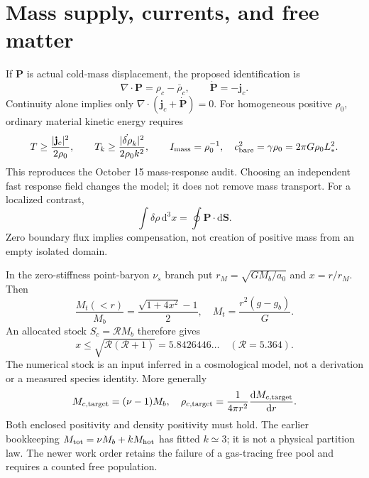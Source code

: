\documentclass[11pt]{article}
\newcommand{\dd}{\mathrm d}
\newcommand{\Mb}{M_b}
\begin{document}
\section{Mass supply, currents, and free matter}
If $\mathbf P$ is actual cold-mass displacement, the proposed identification is
\begin{equation}
 \nabla\cdot\mathbf P=\rho_c-\bar\rho_c,\qquad
 \dot{\mathbf P}=-\mathbf j_c.
\end{equation}
Continuity alone implies only
$\nabla\cdot(\mathbf j_c+\dot{\mathbf P})=0$.
For homogeneous positive $\rho_0$, ordinary material kinetic energy requires
\begin{equation}
 T\ge\frac{|\mathbf j_c|^2}{2\rho_0},\qquad
 T_k\ge\frac{|\dot{\delta\rho}_k|^2}{2\rho_0k^2},\qquad
 I_{\rm mass}=\rho_0^{-1},\quad
 c_{\rm bare}^2=\gamma\rho_0=2\pi G\rho_0L_*^2.
\end{equation}
This reproduces the October 15 mass-response audit. Choosing an independent
fast response field changes the model; it does not remove mass transport.
For a localized contrast,
\begin{equation}
 \int\delta\rho\,\dd^3x=\oint\mathbf P\cdot\dd\mathbf S.
\end{equation}
Zero boundary flux implies compensation, not creation of positive mass
from an empty isolated domain.

In the zero-stiffness point-baryon $\nu_s$ branch put
$r_M=\sqrt{G\Mb/a_0}$ and $x=r/r_M$. Then
\begin{equation}
 \frac{M_t(<r)}{\Mb}=\frac{\sqrt{1+4x^2}-1}{2},\quad
 M_t=\frac{r^2(g-g_b)}{G}.
\end{equation}
An allocated stock $S_c=\mathcal R\Mb$ therefore gives
\begin{equation}
 x\le\sqrt{\mathcal R(\mathcal R+1)}=5.8426446\ldots
 \quad(\mathcal R=5.364).
\end{equation}
The numerical stock is an input inferred in a cosmological model, not a
derivation or a measured species identity. More generally
\begin{equation}
 M_{c,\rm target}=(\nu-1)\Mb,\quad
 \rho_{c,\rm target}=\frac{1}{4\pi r^2}\frac{\dd M_{c,\rm target}}{\dd r}.
\end{equation}
Both enclosed positivity and density positivity must hold.
The earlier bookkeeping $M_{\rm tot}=\nu\Mb+k M_{\rm hot}$ has fitted
$k\simeq3$; it is not a physical partition law. The newer work order retains
the failure of a gas-tracing free pool and requires a counted free population.
\end{document}
